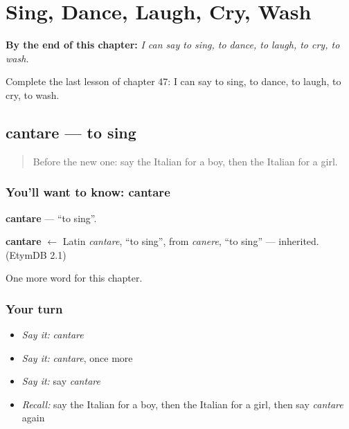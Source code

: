 
\chapter{Sing, Dance, Laugh, Cry, Wash}
\label{ch:it-sing-dance-laugh-cry-wash}

\begin{chapteropening}
\textbf{By the end of this chapter:} \emph{I can say to sing, to dance, to laugh, to cry, to wash.}

Complete the last lesson of chapter 47: I can say to sing, to dance, to laugh, to cry, to wash.
\end{chapteropening}

\section[cantare]{cantare — to sing}

\label{lesson:IT-C47-cantare}



\begin{quote}
Before the new one: say the Italian for a boy, then the Italian for a girl.
\end{quote}

\subsection*{You'll want to know: cantare}
\textbf{cantare} — \textquotedblleft{}to sing\textquotedblright{}.

\begin{cousinweb}
\textbf{cantare} $\leftarrow$ Latin \emph{cantare}, \textquotedblleft{}to sing\textquotedblright{}, from \emph{canere}, \textquotedblleft{}to sing\textquotedblright{} — inherited. (EtymDB 2.1)
\end{cousinweb}

\begin{grammarlens}[title={What you've built}]
One more word for this chapter.
\end{grammarlens}

\subsection*{Your turn}
\begin{itemize}
\raggedright
  \item \emph{Say it:} \emph{cantare}
  \item \emph{Say it:} \emph{cantare}, once more
  \item \emph{Say it:} say \emph{cantare}
  \item \emph{Recall:} say the Italian for a boy, then the Italian for a girl, then say \emph{cantare} again
\end{itemize}

